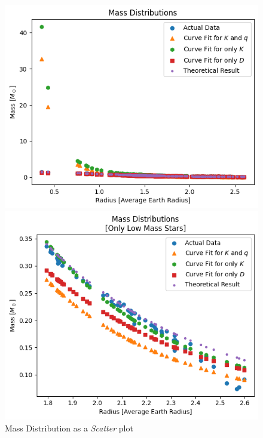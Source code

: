 \documentclass[letterpaper,12pt]{article}
\begin{document}
\begin{figure}[H]
\begin{minipage}{.5\textwidth}
\centerline{\includegraphics[width=\linewidth]{figures/11_n_s_ms_r.png}}
\end{minipage}
\begin{minipage}{.5\textwidth}
\centerline{\includegraphics[width=\linewidth]{figures/12_n_s_ms_r_.png}}
\end{minipage}
\caption{Mass Distribution as a \textit{Scatter} plot}
\label{fig:11_12}
\end{figure}
\end{document}
